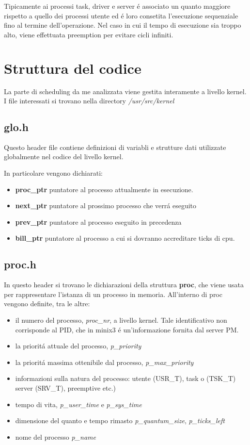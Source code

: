 \documentclass[a4paper,12pt]{report}
\begin{document}
Tipicamente ai processi task, driver e server \'e associato un quanto maggiore rispetto
a quello dei processi utente ed \'e loro consetita l'esecuzione sequenziale fino al 
termine dell'operazione. Nel caso in cui il tempo di esecuzione sia troppo
alto, viene effettuata preemption per evitare cicli infiniti.

\section{Struttura del codice}
La parte di scheduling da me analizzata viene gestita interamente a livello kernel.
I file interessati si trovano nella directory \textit{/usr/src/kernel}

\subsection{glo.h}
Questo header file contiene definizioni di variabli e strutture dati
utilizzate globalmente nel codice del livello kernel.

In particolare vengono dichiarati:
\begin{itemize}
\item \textbf{proc\_ptr} puntatore al processo attualmente in esecuzione.
\item \textbf{next\_ptr} puntatore al prossimo processo che verr\'a eseguito
\item \textbf{prev\_ptr} puntatore al processo eseguito in precedenza
\item \textbf{bill\_ptr} puntatore al processo a cui si dovranno accreditare
ticks di cpu.
\end{itemize}

\subsection{proc.h}
In questo header si trovano le dichiarazioni della struttura \textbf{proc},
che viene usata per rappresentare l'istanza di un processo in memoria.
All'interno di proc vengono definite,  tra le altre:
\begin{itemize}
 \item il numero del processo, \textit{proc\_nr}, a livello kernel. Tale identificativo
	non corrisponde al PID, che in minix3 \'e un'informazione fornita
        dal server PM.
 \item la priorit\'a attuale del processo, \textit{p\_priority}
 \item la priorit\'a massima ottenibile dal processo, \textit{p\_max\_priority}
 \item informazioni sulla natura del processo: utente (USR\_T), task o
 (TSK\_T) server (SRV\_T), preemptive etc.)
 \item tempo di vita, \textit{p\_user\_time} e \textit{p\_sys\_time}
 \item dimensione del quanto e tempo rimasto \textit{p\_quantum\_size},
 \textit{p\_ticks\_left}
 \item nome del processo \textit{p\_name}
\end{itemize}
\end{document}
